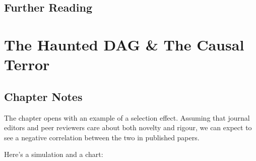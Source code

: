 \documentclass[
]{book}
\begin{document}
\hypertarget{further-reading-4}{%
\section*{Further Reading}\label{further-reading-4}}

\hypertarget{haunted_dag}{%
\chapter{The Haunted DAG \& The Causal Terror}\label{haunted_dag}}

\hypertarget{chapter-notes-5}{%
\section{Chapter Notes}\label{chapter-notes-5}}

The chapter opens with an example of a selection effect. Assuming that journal editors and peer reviewers care about both novelty and rigour, we can expect to see a negative correlation between the two in published papers.

Here's a simulation and a chart:
\end{document}
